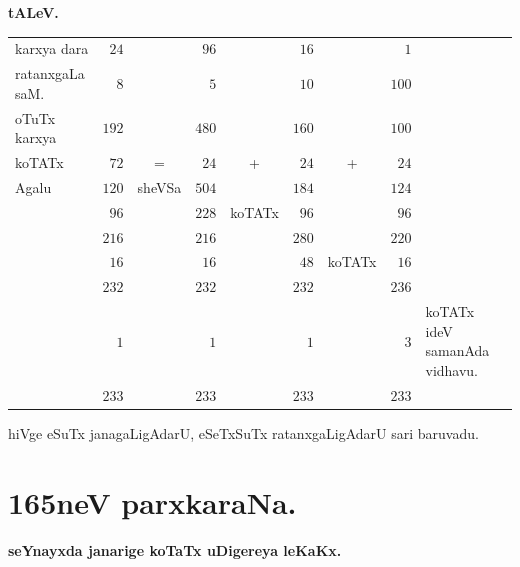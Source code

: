 \begin{center}
{\bf tALeV.}
\medskip

\begin{tabular}{lrcrcrcrl}
karxya dara & $24$ && $96$ && $16$ && $1$\\
ratanxgaLa saM. & $8$ && $5$ && $10$ && $100$\\
\cline{2-8}
oTuTx karxya & $192$ && $480$ && $160$ && $100$\\
koTATx & $72$ & = & $24$ & + & $24$ & + & $24$\\
\cline{2-8}
Agalu & $120$ & sheVSa & $504$ & & $184$ & & $124$\\
 & $96$ & & $228$ & koTATx & $96$ & & $96$\\
\cline{2-8}
 & $216$ & & $216$ & & $280$ & & $220$\\
 & $16$ && $16$ && $48$ & koTATx & $16$\\
\cline{2-8}
 & $232$ && $232$ && $232$ && $236$\\
 & $1$ && $1$ && $1$ && $3$ & koTATx ideV samanAda vidhavu.\\
\cline{2-8}
 & $233$ && $233$ && $233$ && $233$
\end{tabular}
\end{center}
hiVge eSuTx janagaLigAdarU, eSeTxSuTx ratanxgaLigAdarU sari baruvadu.


\chapter{165neV parxkaraNa.}

\begin{center}
{\large\bf seYnayxda janarige koTaTx uDigereya leKaKx.}
\end{center}

